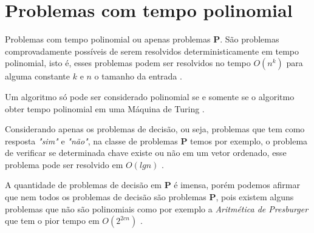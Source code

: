 \section{Problemas com tempo polinomial}

Problemas com tempo polinomial ou apenas problemas \textbf{P}.
São problemas comprovadamente possíveis de serem resolvidos deterministicamente em tempo polinomial, isto é, esses problemas podem ser resolvidos no tempo $O(n^k)$ para alguma constante $k$ e $n$ o tamanho da entrada \cite{leisersonalgoritmos}.

Um algoritmo só pode ser considerado polinomial se e somente se o algoritmo obter tempo polinomial em uma Máquina de Turing \cite{HOPCROFT1974}.

Considerando apenas os problemas de decisão, ou seja, problemas que tem como resposta \textit{"sim"} e \textit{"não"}, na classe de problemas \textbf{P} temos por exemplo, o problema de verificar se determinada chave existe ou não em um vetor ordenado, esse problema pode ser resolvido em $O(lg n)$ \cite{NEAPOLITAN1997}.

A quantidade de problemas de decisão em \textbf{P} é imensa, porém podemos afirmar que nem todos os problemas de decisão são problemas \textbf{P}, pois existem alguns problemas que não são polinomiais como por exemplo a \textit{Aritmética de Presburger} que tem o pior tempo em $O(2^{2cn})$ \cite{NEAPOLITAN1997}.

